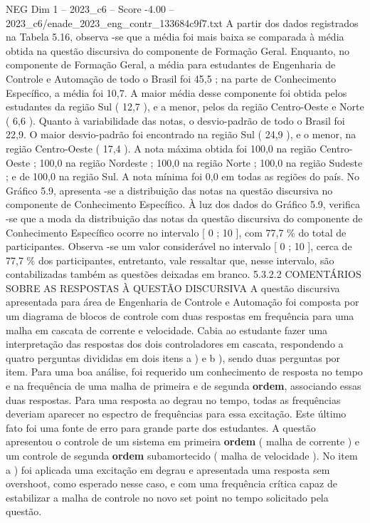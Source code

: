 \begin{textsample}{NEG Dim 1 – 2023\_c6 – Score -4.00 – 2023\_c6/enade\_2023\_eng\_contr\_133684c9f7.txt}
A partir dos dados registrados na Tabela 5.16, observa -se que a média foi mais baixa se comparada à média obtida na questão discursiva do componente de Formação Geral.
Enquanto, no componente de Formação Geral, a média para estudantes de Engenharia de Controle e Automação de todo o Brasil foi 45,5 ; na parte de Conhecimento Específico, a média foi 10,7.
A maior média desse componente foi obtida pelos estudantes da região Sul ( 12,7 ), e a menor, pelos da região Centro-Oeste e Norte ( 6,6 ).
Quanto à variabilidade das notas, o desvio-padrão de todo o Brasil foi 22,9.
O maior desvio-padrão foi encontrado na região Sul ( 24,9 ), e o menor, na região Centro-Oeste ( 17,4 ).
A nota máxima obtida foi 100,0 na região Centro-Oeste ; 100,0 na região Nordeste ; 100,0 na região Norte ; 100,0 na região Sudeste ; e de 100,0 na região Sul.
A nota mínima foi 0,0 em todas as regiões do país.
No Gráfico 5.9, apresenta -se a distribuição das notas na questão discursiva no componente de Conhecimento Específico.
À luz dos dados do Gráfico 5.9, verifica -se que a moda da distribuição das notas da questão discursiva do componente de Conhecimento Específico ocorre no intervalo [ 0 ; 10 ], com 77,7 \% do total de participantes.
Observa -se um valor considerável no intervalo [ 0 ; 10 ], cerca de 77,7 \% dos participantes, entretanto, vale ressaltar que, nesse intervalo, são contabilizadas também as questões deixadas em branco. 5.3.2.2 COMENTÁRIOS SOBRE AS RESPOSTAS À QUESTÃO DISCURSIVA A questão discursiva apresentada para área de Engenharia de Controle e Automação foi composta por um diagrama de blocos de controle com duas respostas em frequência para uma malha em cascata de corrente e velocidade.
Cabia ao estudante fazer uma interpretação das respostas dos dois controladores em cascata, respondendo a quatro perguntas divididas em dois itens a ) e b ), sendo duas perguntas por item.
Para uma boa análise, foi requerido um conhecimento de resposta no tempo e na frequência de uma malha de primeira e de segunda \textbf{ordem}, associando essas duas respostas.
Para uma resposta ao degrau no tempo, todas as frequências deveriam aparecer no espectro de frequências para essa excitação.
Este último fato foi uma fonte de erro para grande parte dos estudantes.
A questão apresentou o controle de um sistema em primeira \textbf{ordem} ( malha de corrente ) e um controle de segunda \textbf{ordem} subamortecido ( malha de velocidade ).
No item a ) foi aplicada uma excitação em degrau e apresentada uma resposta sem overshoot, como esperado nesse caso, e com uma frequência crítica capaz de estabilizar a malha de controle no novo set point no tempo solicitado pela questão.

\end{textsample}
